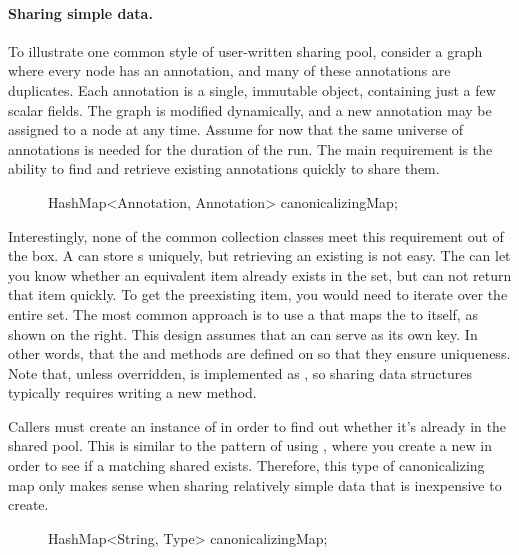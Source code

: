 \paragraph{Sharing simple data.} To illustrate one common style of
user-written sharing pool, consider a graph where every node has an
annotation, and many of these annotations are duplicates.
Each annotation is a single, immutable 
object, containing just a few scalar fields. The graph is modified
dynamically, and a new annotation may be assigned to a node at any
time. Assume for now that the same universe of annotations is needed for the
duration of the run.
The main requirement is the ability to find and
retrieve existing annotations quickly to share them.

\begin{figure}
\centering
\begin{framedlisting}
HashMap<Annotation, Annotation> canonicalizingMap;
\end{framedlisting}
\end{figure}

Interestingly, none of the common collection classes meet this requirement
out of the box. A  can store s uniquely, but
retrieving an existing  is not easy. The 
can let you know whether an equivalent item already
exists in the set, but can not return that item quickly. To get the
preexisting item, you would need to iterate over the entire set. The
most common approach is to use a
 that maps the  to itself, as shown on the
right. This design assumes that an  can serve as its own key.
In other words, that the  and  methods are
defined on  so that they ensure uniqueness. Note that, unless overridden,  is
implemented as \code{==}, so sharing data structures typically requires writing
a new  method.  

Callers must create an instance of  in order
to find out whether it's already in the shared pool. This
is similar to the pattern of using , where you create a new
 in order to see if a matching shared  exists. Therefore, this type
of canonicalizing map only makes sense when sharing relatively simple data
that is inexpensive to create.

\begin{figure}
\centering
\begin{framedlisting}
HashMap<String, Type> canonicalizingMap;
\end{framedlisting}
\end{figure}

